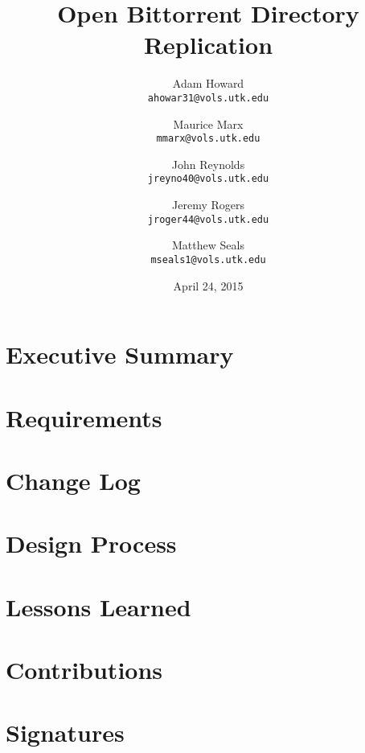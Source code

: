 \documentclass[12 pt]{article}
\title{Open Bittorrent Directory Replication}
\author{Adam Howard \\
	\texttt{ahowar31@vols.utk.edu}
	\and
	Maurice Marx \\
	\texttt{mmarx@vols.utk.edu}
	\and
	John Reynolds \\
	\texttt{jreyno40@vols.utk.edu}
	\and
	Jeremy Rogers \\
	\texttt{jroger44@vols.utk.edu}
	\and
	Matthew Seals \\
	\texttt{mseals1@vols.utk.edu}}
\date{April 24, 2015}
\begin{document}
	\maketitle
	\pagebreak
	\doublespacing
	
	\tableofcontents
	
	\section{Executive Summary}
	
	\section{Requirements}
	
	\section{Change Log}
	
	\section{Design Process}
	
	\section{Lessons Learned}
	
	\section{Contributions}
	
	\section{Signatures}
\end{document}
